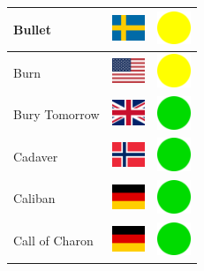 \documentclass[12pt, a4paper, twoside]{report}
\begin{document}
\begin{center}
\begin{longtable}{|p{5cm}|p{2cm}|p{2cm}|}
Bullet & \includegraphics[width=1cm]{4x3/se} & \includegraphics[width=1cm]{likes/m} \\ \hline
Burn & \includegraphics[width=1cm]{4x3/us} & \includegraphics[width=1cm]{likes/m} \\ \hline
Bury Tomorrow & \includegraphics[width=1cm]{4x3/gb} & \includegraphics[width=1cm]{likes/y} \\ \hline
Cadaver & \includegraphics[width=1cm]{4x3/no} & \includegraphics[width=1cm]{likes/y} \\ \hline
Caliban & \includegraphics[width=1cm]{4x3/de} & \includegraphics[width=1cm]{likes/y} \\ \hline
Call of Charon & \includegraphics[width=1cm]{4x3/de} & \includegraphics[width=1cm]{likes/y} \\ \hline

\end{longtable}
\end{center}
\end{document}
